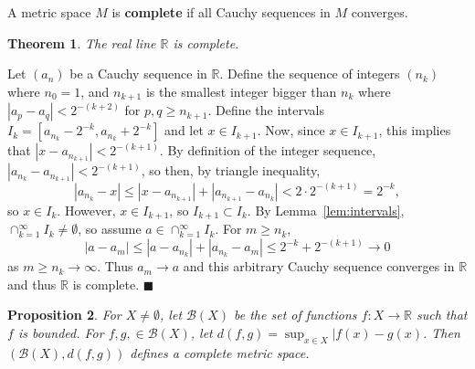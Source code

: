 \documentclass[letter-paper]{tufte-book}
\newtheorem{theorem}{\color{pastel-blue}Theorem}[section]
\newtheorem{proposition}[theorem]{\color{pastel-blue}Proposition}
\newenvironment{proof}[1][Proof]{\begin{trivlist}
\item[\hskip \labelsep {\bfseries #1}]}{\end{trivlist}}
\newcommand{\qed}{\hfill$\blacksquare$}
\begin{document}
A metric space $M$ is \textbf{complete} if all Cauchy sequences in $M$
converges.
\begin{theorem}
  The real line $\mathbb{R}$ is complete.
\end{theorem}

\begin{proof}
  Let $(a_n)$ be a Cauchy sequence in $\mathbb{R}$. Define the sequence of
  integers $(n_k)$ where $n_0 = 1$, and $n_{k+1}$ is the smallest integer bigger
  than $n_k$ where $| a_p - a_q | < 2^{-(k+2)}$ for $p, q \geq n_{k+1}$. Define
  the intervals $I_k = [a_{n_k} - 2^{-k}, a_{n_k} + 2^{-k}]$ and let $x \in
  I_{k+1}$. Now, since $x \in I_{k+1}$, this implies that $|x - a_{n_{k+1}}| <
  2^{-(k+1)}$. By definition of the integer sequence, $|a_{n_{k}} - a_{n_{k+1}}|
  < 2^{-(k+1)}$, so then, by triangle inequality,
  \begin{equation*}
    |a_{n_k} - x| \leq |x - a_{n_{k+1}}| + |a_{n_{k+1}} - a_{n_k}| < 
      2 \cdot 2^{-(k+1)} = 2^{-k},  
  \end{equation*}
  so $x \in I_k$. However, $x \in I_{k+1}$, so $I_{k+1} \subset I_k$. By
  Lemma~\ref{lem:intervals}, $\cap_{k=1}^\infty I_k \neq \emptyset$, so assume
  $a \in \cap_{k=1}^\infty I_k$. For $m \geq n_k$,
  \begin{equation*}
    |a - a_m| \leq |a - a_{n_k}| + |a_{n_k} - a_m| \leq 2^{-k} + 2^{-(k+1)}
    \to 0
  \end{equation*}
  as $m \geq n_k \to \infty$. Thus $a_m \to a$ and this arbitrary Cauchy
  sequence converges in $\mathbb{R}$ and thus $\mathbb{R}$ is complete. \qed
\end{proof}

\begin{proposition}
  For $X \neq \emptyset$, let $\mathcal{B}(X)$ be the set of functions $f : X
  \to \mathbb{R}$ such that $f$ is bounded. For $f, g, \in \mathcal{B}(X)$, let
  $d(f, g) = \sup_{x\in X} |f(x) - g(x)$. Then $(\mathcal{B}(X), d(f,g))$
  defines a complete metric space.
\end{proposition}
\end{document}
